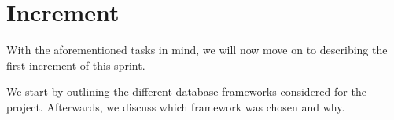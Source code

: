 \section{Increment}
With the aforementioned tasks in mind, we will now move on to describing the first increment of this sprint.

We start by outlining the different database frameworks considered for the project.
Afterwards, we discuss which framework was chosen and why.



